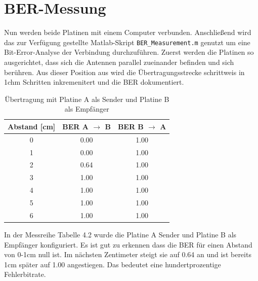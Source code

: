 \section{BER-Messung}
Nun werden beide Platinen mit einem Computer verbunden. Anschließend wird das zur Verfügung gestellte
Matlab-Skript \texttt{BER\_Measurement.m} genutzt um eine Bit-Error-Analyse der Verbindung durchzuführen.
Zuerst werden die Platinen so ausgerichtet, dass sich die Antennen parallel zueinander befinden und sich berühren.
Aus dieser Position aus wird die Übertragungsstrecke schrittweis in 1chm Schritten inkremenitert und die BER dokumentiert.

\begin{table}[h!]
    \centering
        \begin{tabular}{c|c|c}
            Abstand [cm] & BER A $\rightarrow$ B & BER B $\rightarrow$ A \\
            \hline
             0 & 0.00 & 1.00 \\
            \hline
             1 & 0.00 & 1.00 \\
            \hline
             2 & 0.64 & 1.00 \\
            \hline
             3 &  1.00    & 1.00 \\
            \hline
             4 &   1.00  & 1.00 \\
            \hline
             5 & 1.00 & 1.00 \\
            \hline
             6 & 1.00 & 1.00 \\
        \end{tabular}
        \caption{Übertragung mit Platine A als Sender und Platine B als Empfänger}
    \end{table}
In der Messreihe Tabelle 4.2 wurde die Platine A Sender und Platine B als Empfänger konfiguriert.
Es ist gut zu erkennen dass die BER für einen Abstand von 0-1cm null ist. Im nächsten Zentimeter
steigt sie auf 0.64 an und ist bereits 1cm später auf 1.00 angestiegen. Das bedeutet eine
hundertprozentige Fehlerbitrate.\\

